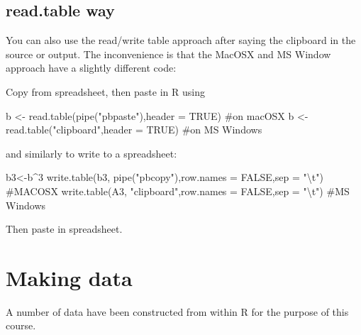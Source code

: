 \documentclass[
  letterpaper,
  DIV=11,
  numbers=noendperiod]{scrreprt}
\newenvironment{Shaded}{\begin{snugshade}}{\end{snugshade}}
\newcommand{\AttributeTok}[1]{\textcolor[rgb]{0.40,0.45,0.13}{#1}}
\newcommand{\CommentTok}[1]{\textcolor[rgb]{0.37,0.37,0.37}{#1}}
\newcommand{\ConstantTok}[1]{\textcolor[rgb]{0.56,0.35,0.01}{#1}}
\newcommand{\DecValTok}[1]{\textcolor[rgb]{0.68,0.00,0.00}{#1}}
\newcommand{\FunctionTok}[1]{\textcolor[rgb]{0.28,0.35,0.67}{#1}}
\newcommand{\NormalTok}[1]{\textcolor[rgb]{0.00,0.23,0.31}{#1}}
\newcommand{\OtherTok}[1]{\textcolor[rgb]{0.00,0.23,0.31}{#1}}
\newcommand{\SpecialCharTok}[1]{\textcolor[rgb]{0.37,0.37,0.37}{#1}}
\newcommand{\StringTok}[1]{\textcolor[rgb]{0.13,0.47,0.30}{#1}}
\begin{document}
\section{read.table way}\label{read.table-way}

You can also use the read/write table approach after saying the
clipboard in the source or output. The inconvenience is that the MacOSX
and MS Window approach have a slightly different code:

Copy from spreadsheet, then paste in R using

\begin{Shaded}
\begin{Highlighting}[]
\NormalTok{b }\OtherTok{\textless{}{-}} \FunctionTok{read.table}\NormalTok{(}\FunctionTok{pipe}\NormalTok{(}\StringTok{"pbpaste"}\NormalTok{),}\AttributeTok{header =} \ConstantTok{TRUE}\NormalTok{) }\CommentTok{\#on macOSX }
\NormalTok{b }\OtherTok{\textless{}{-}} \FunctionTok{read.table}\NormalTok{(}\StringTok{"clipboard"}\NormalTok{,}\AttributeTok{header =} \ConstantTok{TRUE}\NormalTok{) }\CommentTok{\#on MS Windows}
\end{Highlighting}
\end{Shaded}

and similarly to write to a spreadsheet:

\begin{Shaded}
\begin{Highlighting}[]
\NormalTok{b3}\OtherTok{\textless{}{-}}\NormalTok{b}\SpecialCharTok{\^{}}\DecValTok{3}
\FunctionTok{write.table}\NormalTok{(b3, }\FunctionTok{pipe}\NormalTok{(}\StringTok{"pbcopy"}\NormalTok{),}\AttributeTok{row.names =} \ConstantTok{FALSE}\NormalTok{,}\AttributeTok{sep =} \StringTok{"}\SpecialCharTok{\textbackslash{}t}\StringTok{"}\NormalTok{) }\CommentTok{\#MACOSX}
\FunctionTok{write.table}\NormalTok{(A3, }\StringTok{"clipboard"}\NormalTok{,}\AttributeTok{row.names =} \ConstantTok{FALSE}\NormalTok{,}\AttributeTok{sep =} \StringTok{"}\SpecialCharTok{\textbackslash{}t}\StringTok{"}\NormalTok{) }\CommentTok{\#MS Windows}
\end{Highlighting}
\end{Shaded}

Then paste in spreadsheet.

\chapter{Making data}\label{sec-making-data}

A number of data have been constructed from within R for the purpose of
this course.
\end{document}
